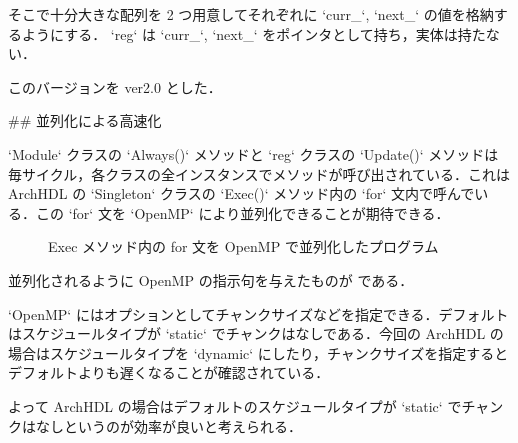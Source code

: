 そこで十分大きな配列を 2 つ用意してそれぞれに `curr_`, `next_` の値を格納するようにする．
`reg` は `curr_`, `next_` をポインタとして持ち，実体は持たない．

このバージョンを ver2.0 とした．




## 並列化による高速化 \label{ss:parallel}

`Module` クラスの `Always()` メソッドと
`reg` クラスの `Update()` メソッドは毎サイクル，各クラスの全インスタンスでメソッドが呼び出されている．これは
ArchHDL の `Singleton` クラスの `Exec()` メソッド内の
`for` 文内で呼んでいる．この
`for` 文を `OpenMP` により並列化できることが期待できる．

\begin{figure}[t]
 
 \caption{Exec メソッド内の for 文を OpenMP で並列化したプログラム}
 \label{src:exec_openmp}
\end{figure}

並列化されるように OpenMP の指示句を与えたものが  である．

`OpenMP` にはオプションとしてチャンクサイズなどを指定できる．デフォルトはスケジュールタイプが
`static` でチャンクはなしである．今回の ArchHDL の場合はスケジュールタイプを `dynamic`
にしたり，チャンクサイズを指定するとデフォルトよりも遅くなることが確認されている．

よって ArchHDL の場合はデフォルトのスケジュールタイプが `static` でチャンクはなしというのが効率が良いと考えられる．

